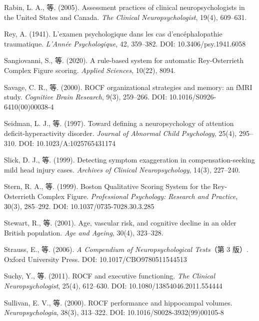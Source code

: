 \documentclass[12pt,a4paper]{ctexart}
\begin{document}
\begin{enumerate}[leftmargin=2em,label={[\arabic*]}]
\item Rabin, L. A., 等. (2005). Assessment practices of clinical neuropsychologists in the United States and Canada. \textit{The Clinical Neuropsychologist}, 19(4), 609–631.

\item Rey, A. (1941). L'examen psychologique dans les cas d'encéphalopathie traumatique. \textit{L'Année Psychologique}, 42, 359–382. DOI: 10.3406/psy.1941.6058

\item Sangiovanni, S., 等. (2020). A rule-based system for automatic Rey-Osterrieth Complex Figure scoring. \textit{Applied Sciences}, 10(22), 8094.

\item Savage, C. R., 等. (2000). ROCF organizational strategies and memory: an fMRI study. \textit{Cognitive Brain Research}, 9(3), 259–266. DOI: 10.1016/S0926-6410(00)00038-4

\item Seidman, L. J., 等. (1997). Toward defining a neuropsychology of attention deficit-hyperactivity disorder. \textit{Journal of Abnormal Child Psychology}, 25(4), 295–310. DOI: 10.1023/A:1025765431174

\item Slick, D. J., 等. (1999). Detecting symptom exaggeration in compensation-seeking mild head injury cases. \textit{Archives of Clinical Neuropsychology}, 14(3), 227–240.

\item Stern, R. A., 等. (1999). Boston Qualitative Scoring System for the Rey-Osterrieth Complex Figure. \textit{Professional Psychology: Research and Practice}, 30(3), 285–292. DOI: 10.1037/0735-7028.30.3.285

\item Stewart, R., 等. (2001). Age, vascular risk, and cognitive decline in an older British population. \textit{Age and Ageing}, 30(4), 323–328.

\item Strauss, E., 等. (2006). \textit{A Compendium of Neuropsychological Tests}（第 3 版）. Oxford University Press. DOI: 10.1017/CBO9780511544513

\item Suchy, Y., 等. (2011). ROCF and executive functioning. \textit{The Clinical Neuropsychologist}, 25(4), 612–630. DOI: 10.1080/13854046.2011.554444

\item Sullivan, E. V., 等. (2000). ROCF performance and hippocampal volumes. \textit{Neuropsychologia}, 38(3), 313–322. DOI: 10.1016/S0028-3932(99)00105-8


\end{enumerate}
\end{document}
